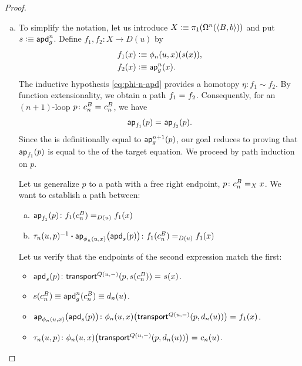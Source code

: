 \begin{proof}
\begin{description}[font=\normalfont\scshape]
\begin{enumerate}[a),font=\upshape]
            \item To simplify the notation, let us introduce $X\mathrel{\vcentcolon}\equiv\pi_1(\Omega^n(\langle B,b\rangle))$ and put $s\mathrel{\vcentcolon}\equiv\mathsf{apd}^n_g$. Define $f_1,f_2\colon X\to D(u)$ by
            \begin{align*}
                f_1(x)&\mathrel{\vcentcolon}\equiv\phi_n(u,x)(s(x)),\\
                f_2(x)&\mathrel{\vcentcolon}\equiv\mathsf{ap}^n_g(x).
            \end{align*}
            The inductive hypothesis \eqref{eq:phi-n-apd} provides a homotopy $\eta\colon f_1\sim f_2$. By function extensionality, we obtain a path $f_1\mathrel{=_{}}f_2$. Consequently, for an $(n+1)$-loop $p\colon c_n^B\eq{}c_n^B$, we have
            \[
                \mathsf{ap}_{f_1}(p)\mathrel{=_{}}\mathsf{ap}_{f_2}(p).
            \]
            Since the \rhs is definitionally equal to $\mathsf{ap}^{n+1}_g(p)$, our goal reduces to proving that $\mathsf{ap}_{f_1}(p)$ is equal to the \lhs of the target equation. We proceed by path induction on $p$.

            Let us generalize $p$ to a path with a free right endpoint, $p\colon c_n^B\eq{X}x$. We want to establish a path between:
            \begin{enumerate}[a),font=\upshape]
                \item $\fun{ap}_{f_1}(p) \colon f_1(c_n^B) \eq{D(u)} f_1(x)$
                
                \item $\tau_n(u,p)^{-1} \ct \fun{ap}_{\phi_n(u,x)}\bigl(\fun{apd}_s(p)\bigr) \colon f_1(c_n^B) \eq{D(u)} f_1(x)$
            \end{enumerate}

            Let us verify that the endpoints of the second expression match the first:
            \begin{itemize}
                \item $\fun{apd}_s(p)\colon\fun{transport}^{Q(u,\dummy)}(p, s(c_n^B))\eq{}s(x)$.

                \item $s(c_n^B)\equiv\mathsf{apd}^n_g(c_n^B)\equiv d_n(u)$.

                \item $\fun{ap}_{\phi_n(u,x)}\bigl(\fun{apd}_s(p)\bigr)\colon\phi_n(u,x)\bigl(\fun{transport}^{Q(u,\dummy)}(p, d_n(u))\bigr)\eq{}f_1(x)$.

                \item $\tau_n(u,p)\colon\phi_n(u,x)\bigl(\fun{transport}^{Q(u,\dummy)}(p, d_n(u))\bigr)\eq{}c_n(u)$.


\end{itemize}
\end{enumerate}
\end{description}
\end{proof}
